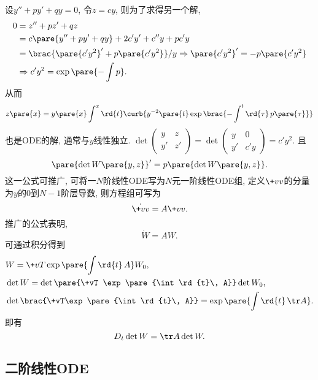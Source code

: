 \documentclass[hidelinks]{ctexart}
\begin{document}
设$y'' + py' + qy = 0$, 令$z = cy$, 则为了求得另一个解,
\begin{align*}
    0 &= z'' + pz' + qz \\
    &= c\pare{y''+py'+qy} + 2c'y' + c''y + pc'y \\
    &= \brac{\pare{c'y^2}' + p\pare{c'y^2}}/y \Rightarrow \pare{c'y^2}' = -p\pare{c'y^2} \\
    & \Rightarrow  c'y^2 = \exp \pare{-\int p}.
\end{align*}
从而
\[ z\pare{x} = y\pare{x} \int^x \rd{t}\curb{y^{-2}\pare{t}\exp\brac{-\int^t \rd{\tau}\,p\pare{\tau}}} \]
也是ODE的解, 通常与$y$线性独立.
 $\det \begin{pmatrix}
    y & z \\
    y' & z'
\end{pmatrix} = \det \begin{pmatrix}
    y & 0 \\
    y' & c'y
\end{pmatrix} = c'y^2$. 且
\[ \pare{\det W\pare{y,z}}' = p\pare{\det W\pare{y,z}}. \]
这一公式可推广, 可将一$N$阶线性ODE写为$N$元一阶线性ODE组, 定义$\+vv$的分量为$y$的$0$到$N-1$阶层导数, 则方程组可写为
\[ \dot{\+vv} = A\+vv. \]
推广的公式表明,
\[ \dot{W} = AW. \]
可通过积分得到
\begin{align*}
    & W = \+vT \exp \pare{\int \rd{t}\, A} W_0, \\
    & \det W = \det \pare{\+vT \exp \pare{\int \rd{t}\, A}}\det W_0, \\
    & \det \brac{\+vT\exp\pare{\int \rd{t}\, A}} = \exp\pare{\int \rd{t}\,\tr A}.
\end{align*}
即有
\[ D_t \det W = \tr A \det W. \]


\subsection{二阶线性ODE} %
\label{sub:二阶线性ode}
\end{document}
